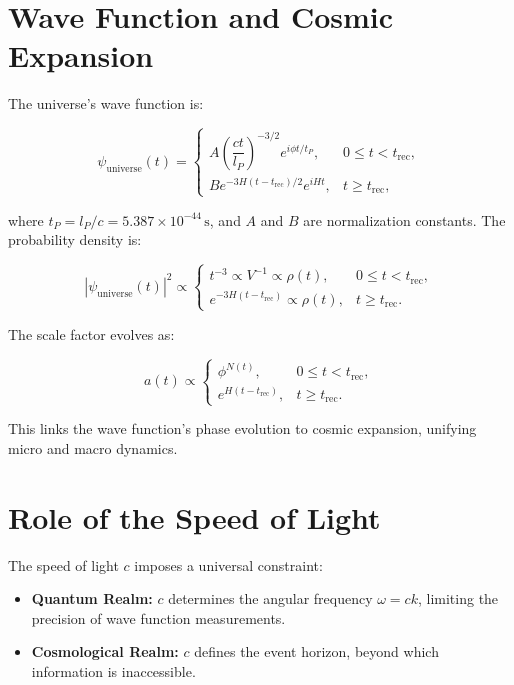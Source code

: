 \documentclass[12pt,a4paper]{article}
\begin{document}
\section{Wave Function and Cosmic Expansion}

The universe's wave function is:

\begin{equation}
\psi_{\mathrm{universe}}(t) =
\begin{cases}
A\left(\dfrac{ct}{l_P}\right)^{-3/2} e^{i\phi t/t_P}, & 0 \leq t < t_{\mathrm{rec}},\\[6pt]
B e^{-3H(t-t_{\mathrm{rec}})/2} e^{iHt}, & t \geq t_{\mathrm{rec}},
\end{cases}
\end{equation}

where \(t_P = l_P/c = 5.387 \times 10^{-44}\,\mathrm{s}\), and \(A\) and \(B\) are normalization constants. The probability density is:

\begin{equation}
|\psi_{\mathrm{universe}}(t)|^2 \propto
\begin{cases}
t^{-3} \propto V^{-1} \propto \rho(t), & 0 \leq t < t_{\mathrm{rec}},\\[4pt]
e^{-3H(t-t_{\mathrm{rec}})} \propto \rho(t), & t \geq t_{\mathrm{rec}}.
\end{cases}
\end{equation}

The scale factor evolves as:

\begin{equation}
a(t) \propto
\begin{cases}
\phi^{N(t)}, & 0 \leq t < t_{\mathrm{rec}},\\[4pt]
e^{H(t-t_{\mathrm{rec}})}, & t \geq t_{\mathrm{rec}}.
\end{cases}
\end{equation}

This links the wave function's phase evolution to cosmic expansion, unifying micro and macro dynamics.

\section{Role of the Speed of Light}

The speed of light \(c\) imposes a universal constraint:

\begin{itemize}
  \item \textbf{Quantum Realm:} \(c\) determines the angular frequency \(\omega = ck\), limiting the precision of wave function measurements.
  \item \textbf{Cosmological Realm:} \(c\) defines the event horizon, beyond which information is inaccessible.
\end{itemize}
\end{document}
